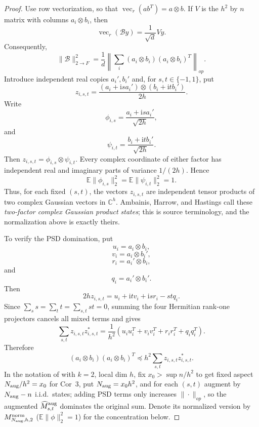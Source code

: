 \documentclass[11pt]{article}
\numberwithin{equation}{section}
\theoremstyle{definition}
\theoremstyle{remark}
\newcommand{\E}{\mathbb E}
\newcommand{\1}{\boldsymbol 1}
\begin{document}
\begin{aiblock}
\begin{proof}
  Use row vectorization, so that
  $\operatorname{vec}_r(ab^T)=a\otimes b$. If $V$ is the
  $h^2$ by $n$ matrix with columns $a_i\otimes b_i$, then
  \[
    \operatorname{vec}_r(\mathcal{B}y)=\frac1{\sqrt d}Vy.
  \]
  Consequently,
  \[
    \|\mathcal{B}\|_{2\mathbin{\to}F}^2 =\frac1d
    \left\|\sum_i(a_i\otimes b_i)(a_i\otimes
    b_i)^T\right\|_{op}.
  \]
  Introduce independent real copies $a_i',b_i'$ and, for
  $s,t\in\{-1,1\}$, put
  \[
    z_{i,s,t}=\frac{(a_i+\mathrm i s a_i')\otimes(b_i+
    \mathrm i t b_i')}{2h}.
  \]
  Write
  \[
    \phi_{i,s}=\frac{a_i+\mathrm i s a_i'}{\sqrt{2h}},
  \]
  and
  \[
    \psi_{i,t}=\frac{b_i+\mathrm i t b_i'}{\sqrt{2h}}.
  \]
  Then $z_{i,s,t}=\phi_{i,s}\otimes\psi_{i,t}$. Every
  complex coordinate of either factor has independent
  real and imaginary parts of variance $1/(2h)$. Hence
  \[
    \E\|\phi_{i,s}\|_2^2=\E\|\psi_{i,t}\|_2^2=1.
  \]
  Thus, for each fixed $(s,t)$, the vectors $z_{i,s,t}$
  are independent tensor products of two complex Gaussian
  vectors in $\mathbb C^h$. Ambainis, Harrow, and
  Hastings call these \emph{two-factor complex Gaussian
  product states}; this is source terminology, and the
  normalization above is exactly theirs.

  To verify the PSD domination, put
  \[
    u_i=a_i\otimes b_i,
  \]
  \[
    v_i=a_i\otimes b_i',
  \]
  \[
    r_i=a_i'\otimes b_i,
  \]
  and
  \[
    q_i=a_i'\otimes b_i'.
  \]
  Then
  \[
    2h z_{i,s,t}=u_i+\mathrm i t v_i+\mathrm i s
    r_i-stq_i.
  \]
  Since $\sum_s s=\sum_t t=\sum_{s,t}st=0$,
  summing the four Hermitian rank-one
  projectors cancels all mixed terms and
  gives
  \[
    \sum_{s,t}z_{i,s,t}z_{i,s,t}^* =\frac1{h^2}
    \left(u_iu_i^T+v_iv_i^T+r_ir_i^T+q_iq_i^T\right).
  \]
  Therefore
  \[
    (a_i\otimes b_i)(a_i\otimes b_i)^T \preceq
    h^2\sum_{s,t}z_{i,s,t}z_{i,s,t}^*.
  \]
  In the notation of
  \cite{AmbainisHarrowHastings2012} with $k=2$,
  local dim $h$, fix $x_0>\sup n/h^2$ to get
  fixed aspect $N_{\rm aug}/h^2=x_0$ for Cor~3,
  put $N_{\rm aug}=x_0h^2$, and for each
  $(s,t)$ augment by $N_{\rm aug}-n$ i.i.d.\
  states; adding PSD terms only increases
  $\|\cdot\|_{op}$, so the augmented
  $\widehat M_{s,t}^{\rm aug}$ dominates the
  original sum. Denote its normalized version
  by $M_{N_{\rm aug},h,2}^{\rm norm}$
  ($\E\|\phi\|_2^2=1$) for the concentration
  below.



\end{proof}
\end{aiblock}
\end{document}

